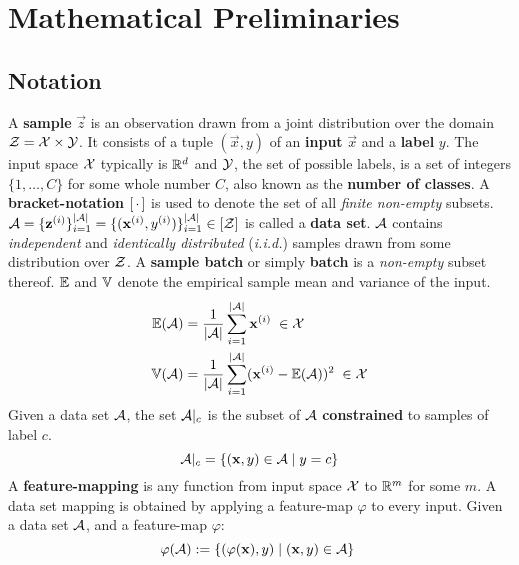 

\chapter{Mathematical Preliminaries}
\label{chap:Background}

\section{Notation}

A \textbf{sample} $\vec z$ is an observation drawn from a joint distribution over the domain $\mathcal Z = \mathcal X \times \mathcal Y$. 
It consists of a tuple $(\vec x, y)$ of an \textbf{input} $\vec x$ and a \textbf{label} $y$. 
The input space $\mathcal X$ typically is $\mathbb{R}^d$ and $\mathcal Y$, the set of possible labels, is a set of integers $\{1, \dots, C\}$ for some whole number $C$, also known as the \textbf{number of classes}.
A \textbf{bracket-notation} $[\, \cdot \,]$ is used to denote the set of all \textit{finite non-empty} subsets.
$\mathcal A = \{\mathbf z^{(i)}\}_{i=1}^{| \mathcal A |} = \{(\mathbf x^{(i)}, y^{(i)})\}_{i=1}^{| \mathcal A |} \in [\mathcal Z]$ is called a \textbf{data set}. $\mathcal A $ contains \textit{independent} and \textit{identically distributed} (\textit{i.i.d.}) samples drawn from some distribution over $\mathcal Z$.
A \textbf{sample batch} or simply \textbf{batch} is a \textit{non-empty} subset thereof.
$\operatorname{\mathbb{E}}$ and $\operatorname{\mathbb{V}}$ denote the empirical sample mean and variance of the input.
\begin{align}
    \operatorname{\mathbb{E}} ({\mathcal A}) &= \frac 1 {\lvert \mathcal A \rvert} \sum _{i=1}^{\lvert \mathcal A \rvert} \mathbf x^{(i)} \; \in \mathcal X
    \label{eqn:sample_mean} \\
    \operatorname{\mathbb{V}} ({\mathcal A}) &= \frac 1 {\lvert \mathcal A \rvert} \sum _{i=1}^{\lvert \mathcal A \rvert} (\mathbf x^{(i)} - \operatorname{\mathbb{E}} ({\mathcal A}))^2 \; \in \mathcal X 
    \label{eqn:sample_var} 
\end{align}
%
Given a data set $\mathcal A$, the set $\mathcal A|_c$ is the subset of $\mathcal A$ \textbf{constrained} to samples of label $c$.
\begin{equation}
    \mathcal A|_c = \{(\mathbf x, y) \in \mathcal A \mid y = c\}
    \label{eqn:class_constrained}
\end{equation}
%
A \textbf{feature-mapping} is any function from input space $\mathcal X$ to $\mathbb{R}^m$ for some $m$.
A data set mapping is obtained by applying a feature-map $\varphi$ to every input. Given a data set $\mathcal A$, and a feature-map $\varphi$:
\begin{equation}
    \varphi(\mathcal A) := \{(\varphi(\mathbf x), y) \mid (\mathbf x, y) \in \mathcal A\} \;
    \label{eqn:feature_mapping}
\end{equation}



